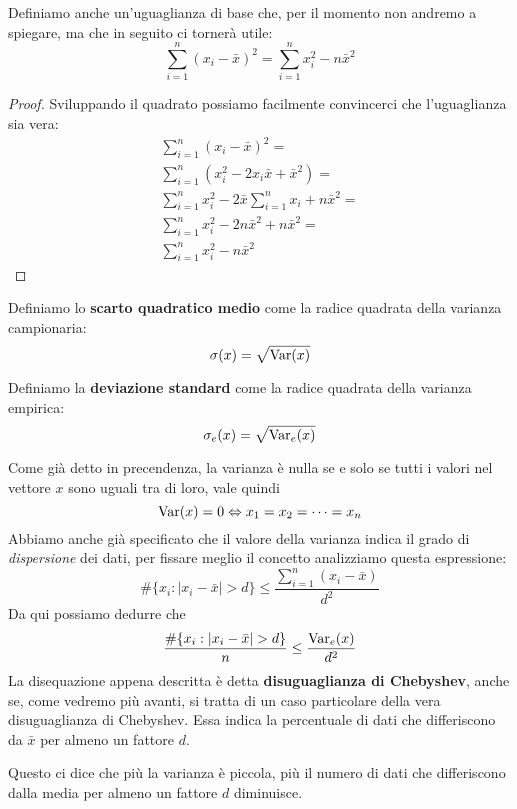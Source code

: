 Definiamo anche un'uguaglianza di base che, per il momento non andremo a spiegare, ma che in
seguito ci tornerà utile:
\[ \sum_{i=1}^n (x_i - \bar{x})^2 = \sum_{i=1}^n x_i^2 - n \bar{x}^2 \]
\begin{proof}
	Sviluppando il quadrato possiamo facilmente convincerci che l'uguaglianza sia vera:
	\begin{align*}
		\sum_{i=1}^n (x_i - \bar{x})^2 =                                \\
		\sum_{i=1}^n (x_i^2 - 2 x_i \bar{x} + \bar{x}^2) =              \\
		\sum_{i=1}^n x_i^2 - 2 \bar{x} \sum_{i=1}^n x_i + n \bar{x}^2 = \\
		\sum_{i=1}^n x_i^2 - 2 n \bar{x}^2 + n \bar{x}^2 =              \\
		\sum_{i=1}^n x_i^2 - n \bar{x}^2
	\end{align*}
\end{proof}

\begin{definition}
	Definiamo lo \textbf{scarto quadratico medio} come la radice quadrata della varianza
	campionaria:
	\[ \sigma (x) = \sqrt{\operatorname{Var} (x)} \]
\end{definition}

\begin{definition}
	Definiamo la \textbf{deviazione standard} come la radice quadrata della varianza empirica:
	\[ \sigma_e (x) = \sqrt{\operatorname{Var}_e (x)} \]
\end{definition}

Come già detto in precendenza, la varianza è nulla se e solo se tutti i valori nel vettore $x$
sono uguali tra di loro, vale quindi
\[ \operatorname{Var}(x) = 0 \Leftrightarrow x_1 = x_2 = \dots = x_n \]
Abbiamo anche già specificato che il valore della varianza indica il grado di \emph{dispersione}
dei dati, per fissare meglio il concetto analizziamo questa espressione:
\[ \# \{ x_i : |x_i - \bar{x}| > d  \} \leq \frac{\sum_{i=1}^n (x_i - \bar{x})}{d^2} \]
Da qui possiamo dedurre che
\[ \frac{\# \{ x_i : |x_i - \bar{x}| > d \}}{n} \leq \frac{\operatorname{Var}_e(x)}{d^2} \]
La disequazione appena descritta è detta \textbf{disuguaglianza di Chebyshev}, anche se, come
vedremo più avanti, si tratta di un caso particolare della vera disuguaglianza di Chebyshev. Essa
indica la percentuale di dati che differiscono da $\bar{x}$ per almeno un fattore $d$.

\begin{observation}
	Questo ci dice che più la varianza è piccola, più il numero di dati che differiscono dalla
	media per almeno un fattore $d$ diminuisce.
\end{observation}

